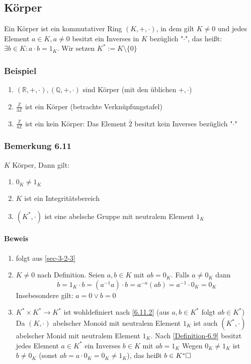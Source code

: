 \documentclass[a4paper]{scrartcl}
\theoremstyle{definition}
\theoremstyle{plain}
\theoremstyle{plain}
\theoremstyle{remark}
\theoremstyle{remark}
\theoremstyle{remark}
\theoremstyle{remark}
\theoremstyle{remark}
\begin{document}
\subsection{Körper}
\label{sec-3-3}
\label{Definition-6.9}
Ein Körper ist ein kommutativer Ring $(K,+,\cdot)$, in dem gilt $K\neq 0$ und jedes Element $a\in K, a\neq 0$ besitzt ein Inverses in $K$ bezüglich "$\cdot$", das heißt: $\exists b\in K:a\cdot b = 1_K$. Wir setzen $K^\ast := K\setminus\{0\}$
\subsubsection{Beispiel}
\label{sec-3-3-1}
\begin{enumerate}
\item $(\mathbb{R},+,\cdot),(\mathbb{Q},+,\cdot)$ sind Körper (mit den üblichen $+,\cdot$)
\item $\frac{\mathbb{Z}}{3\mathbb{Z}}$ ist ein Körper (betrachte Verknüpfungstafel)
\item $\frac{\mathbb{Z}}{4\mathbb{Z}}$ ist ein kein Körper: Das Element $\bar 2$ besitzt kein Inverses bezüglich "$\cdot$"
\end{enumerate}
\subsubsection{Bemerkung 6.11}
\label{sec-3-3-2}
\label{remark:integ_neutral}
$K$ Körper, Dann gilt:
\begin{enumerate}
\item $0_K \neq 1_K$
\item \label{6.11.2} $K$ ist ein Integritätsbereich
\item $(K^\ast,\cdot)$ ist eine abelsche Gruppe mit neutralem Element $1_K$
\end{enumerate}
\paragraph{Beweis}
\label{sec-3-3-2-1}
\begin{enumerate}
\item folgt aus \ref{sec-3-2-3}
\item $K\neq 0$ nach Definition. Seien $a,b\in K$ mit $a b = 0_K$. Falls $a\neq 0_K$ dann
\[b = 1_K \cdot b = (a^{-1} a)\cdot b = a^{-a}(a b) = a^{-1}\cdot 0_K = 0_K\]
Insebesondere gilt: $a = 0\vee b = 0$
\item $K^\ast\times K^\ast \to K^\ast$ ist wohldefiniert nach \ref{6.11.2} (aus $a,b\in K^\ast$ folgt $a b\in K^\ast$) \\
        Da $(K,\cdot)$ abelscher Monoid mit neutralem Element $1_K$ ist auch $(K^\ast,\cdot)$ abelscher Monid mit neutralem Element $1_K$.
Nach \ref{Definition-6.9} besitzt jedes Element $a\in K^\ast$ ein Inverses $b\in K$ mit $a b = 1_K$ Wegen $0_K \neq 1_K$ ist $b\neq 0_K$ (sonst $a b = a\cdot 0_K = 0_K \neq 1_K$), das heißt $b\in K^\ast\hfill\square$
\end{enumerate}
\end{document}
